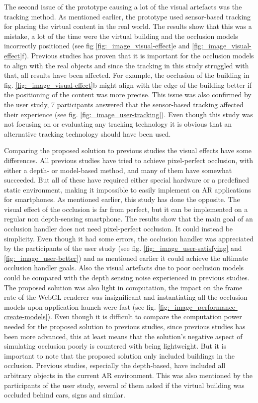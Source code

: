 The second issue of the prototype causing a lot of the visual artefacts was the tracking method. As mentioned earlier, the prototype used sensor-based tracking for placing the virtual content in the real world. The results show that this was a mistake, a lot of the time were the virtual building and the occlusion models incorrectly positioned (see fig \ref{fig:_image_visual-effect}e and \ref{fig:_image_visual-effect}f). Previous studies has proven that it is important for the occlusion models to align with the real objects and since the tracking in this study struggled with that, all results have been affected. For example, the occlusion of the building in fig. \ref{fig:_image_visual-effect}b might align with the edge of the building better if the positioning of the content was more precise. This issue was also confirmed by the user study, 7 participants answered that the sensor-based tracking affected their experience (see fig. \ref{fig:_image_user-tracking}). Even though this study was not focusing on or evaluating any tracking technology it is obvious that an alternative tracking technology should have been used.

Comparing the proposed solution to previous studies the visual effects have some differences. All previous studies have tried to achieve pixel-perfect occlusion, with either a depth- or model-based method, and many of them have somewhat succeeded. But all of these have required either special hardware or a predefined static environment, making it impossible to easily implement on AR applications for smartphones. As mentioned earlier, this study has done the opposite. The visual effect of the occlusion is far from perfect, but it can be implemented on a regular non depth-sensing smartphone. The results show that the main goal of an occlusion handler does not need pixel-perfect occlusion. It could instead be simplicity. Even though it had some errors, the occlusion handler was appreciated by the participants of the user study (see fig. \ref{fig:_image_user-satisfying} and \ref{fig:_image_user-better}) and as mentioned earlier it could achieve the ultimate occlusion handler goals. Also the visual artefacts due to poor occlusion models could be compared with the depth sensing noise experienced in previous studies. The proposed solution was also light in computation, the impact on the frame rate of the WebGL renderer was insignificant and instantiating all the occlusion models upon application launch were fast (see fig. \ref{fig:_image_performance-create-models}). Even though it is difficult to compare the computation power needed for the proposed solution to previous studies, since previous studies has been more advanced, this at least means that the solution's negative aspect of simulating occlusion poorly is countered with being lightweight. But it is important to note that the proposed solution only included buildings in the occlusion. Previous studies, especially the depth-based, have included all arbitrary objects in the current AR environment. This was also mentioned by the participants of the user study, several of them asked if the virtual building was occluded behind cars, signs and similar.

